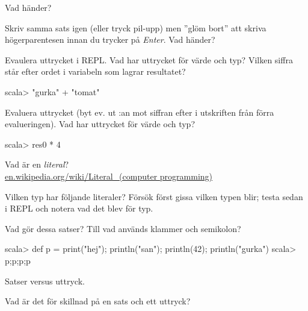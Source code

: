 \Subtask Vad händer? 

\Subtask Skriv samma sats igen (eller tryck pil-upp) men ''glöm bort'' att skriva högerparentesen innan du trycker på \textit{Enter}. Vad händer?

\Subtask Evaulera uttrycket  i REPL. Vad har uttrycket för värde och typ? Vilken siffra står efter ordet  i variabeln som lagrar resultatet?

\begin{REPLnonum}
scala> "gurka" + "tomat"   
\end{REPLnonum}

\Subtask Evaluera uttrycket  (byt ev. ut :an mot siffran efter  i utskriften från förra evalueringen). Vad har uttrycket för värde och typ?
\begin{REPLnonum}
scala> res0 * 4
\end{REPLnonum}


\Task\Pen Vad är en \textit{literal}? \\ \href{https://en.wikipedia.org/wiki/Literal\_\%28computer_programming\%29}{en.wikipedia.org/wiki/Literal\_(computer programming)}%

\Task Vilken typ har följande literaler? Försök först gissa vilken typen blir; testa sedan i REPL och notera vad det blev för typ. %

\Subtask {} 

\Subtask {}

\Subtask {}

\Subtask {}

\Subtask {}

\Subtask {}

\Subtask {}

\Subtask {}

\Subtask {}

\Subtask {}

\Subtask {}


\Task\Pen Vad gör dessa satser? Till vad används klammer och semikolon? %
\begin{REPLnonum}
scala> def p = { print("hej"); println("san"); println(42); println("gurka") }
scala> p;p;p;p
\end{REPLnonum}

\Task\Pen Satser versus uttryck. %

\Subtask Vad är det för skillnad på en sats och ett uttryck?

